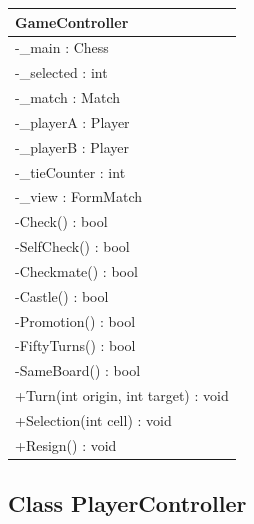 \documentclass[12pt]{article}
\begin{document}
\begin{table}[H]
    \begin{tabular}{|l|}
    \hline
    \rowcolor[HTML]{C0C0C0} 
    \textbf{GameController}              \\ \hline
    \rowcolor[HTML]{EFEFEF} 
    -\_main : Chess                      \\ \hline
    \rowcolor[HTML]{EFEFEF} 
    -\_selected : int                    \\ \hline
    \rowcolor[HTML]{EFEFEF} 
    -\_match : Match                     \\ \hline
    \rowcolor[HTML]{EFEFEF} 
    -\_playerA : Player                  \\ \hline
    \rowcolor[HTML]{EFEFEF} 
    -\_playerB : Player                  \\ \hline
    \rowcolor[HTML]{EFEFEF} 
    -\_tieCounter : int                  \\ \hline
    \rowcolor[HTML]{EFEFEF} 
    -\_view : FormMatch                  \\ \hline
    -Check() : bool                      \\ \hline
    -SelfCheck() : bool                  \\ \hline
    -Checkmate() : bool                  \\ \hline
    -Castle() : bool                     \\ \hline
    -Promotion() : bool                  \\ \hline
    -FiftyTurns() : bool                 \\ \hline
    -SameBoard() : bool                  \\ \hline
    +Turn(int origin, int target) : void \\ \hline
    +Selection(int cell) : void          \\ \hline
    +Resign() : void                     \\ \hline
    \end{tabular}
\end{table}

\newpage


\subsection{Class PlayerController}
\end{document}
